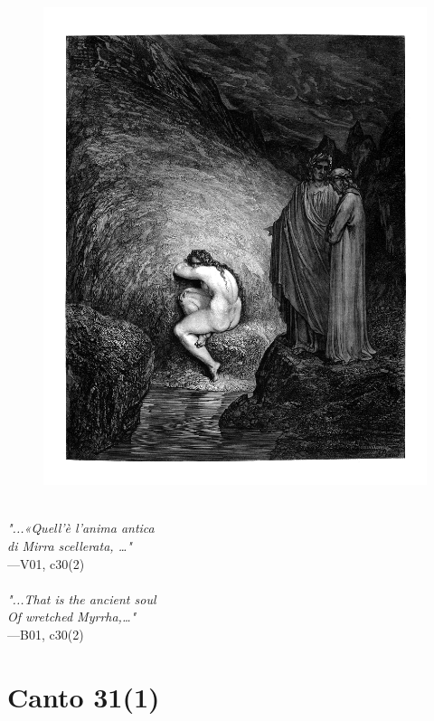 \documentclass[../Dore_vision.tex]{subfiles}
\begin{document}
\begin{figure}[ht]
\centering
\includegraphics[height=\figsize]{illustrations/book_1/V01, c30(2).jpg}
\end{figure}

\begin{center}
\begin{minipage}{0.8\linewidth}
\textit{\\
"...«Quell’è l’anima antica\\di Mirra scellerata, …"} \\
—V01, c30(2) \\~\\
\textit{"...\textquotesingle That is the ancient soul\\Of wretched Myrrha,\textquotesingle…"} \\
—B01, c30(2)
\end{minipage}
\end{center}

\newpage

\section{Canto 31(1)}
\end{document}
